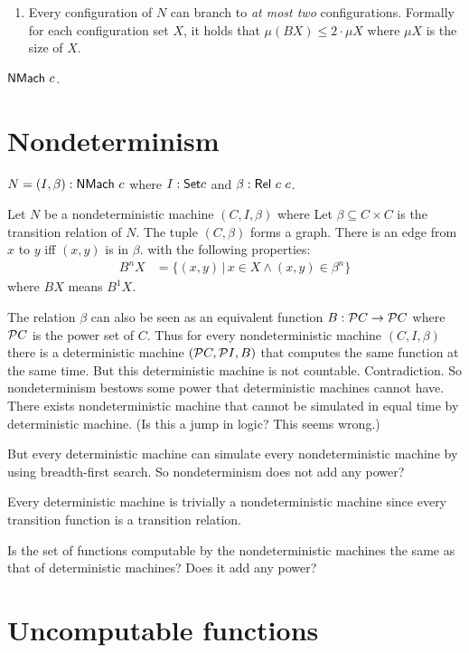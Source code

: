 \begin{enumerate}
    \item
        Every configuration of $N$ can branch to \emph{at most two} configurations.
        Formally for each configuration set $X$, it holds that $\mu(B X) \le 2 \cdot \mu X$
        where $\mu X$ is the size of $X$.
\end{enumerate}

$\mathsf{NMach}~c$.

\section{Nondeterminism}

$N = (I,\beta) : \mathsf{NMach}~c$
where $I : \textsf{Set}{c}$ and $\beta : \mathsf{Rel}~c~c$.

Let $N$ be a nondeterministic machine $(C,I,\beta)$ where
Let $\beta \subseteq C \times C$ is the transition relation of $N$.
The tuple $(C,\beta)$ forms a graph.
There is an edge from $x$ to $y$ iff $(x,y)$ is in $\beta$.
with the following properties:
\begin{align}
    B^n X &= \{ (x,y) \,|\, x \in X \wedge (x,y) \in \beta^n \}
\end{align}
where $B X$ means $B^1 X$.

The relation $\beta$ can also be seen as an equivalent function $B : \mathcal{P} C \to \mathcal{P} C$
where $\mathcal{P} C$ is the power set of $C$.
Thus for every nondeterministic machine $(C, I, \beta)$
there is a deterministic machine $(\mathcal{P} C, \mathcal{P} I, B)$
that computes the same function at the same time.
But this deterministic machine is not countable.
Contradiction.
So nondeterminism bestows some power that deterministic machines cannot have.
There exists nondeterministic machine that cannot be simulated in equal time by deterministic machine.
(Is this a jump in logic? This seems wrong.)

But every deterministic machine can simulate
every nondeterministic machine by using breadth-first search.
So nondeterminism does not add any power?

Every deterministic machine is trivially a
nondeterministic machine since every transition function is a transition relation.

Is the set of functions computable by the nondeterministic machines
the same as that of deterministic machines?
Does it add any power?

\section{Uncomputable functions}

